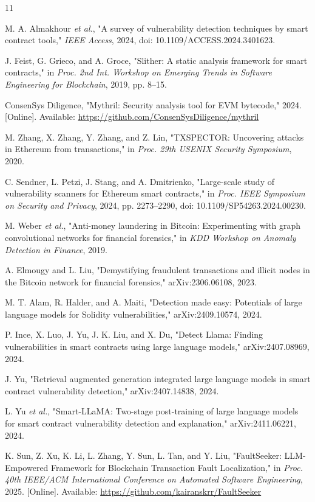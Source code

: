 \documentclass[conference]{IEEEtran}
\begin{document}
\begin{thebibliography}{11}

M. A. Almakhour \emph{et al.}, "A survey of vulnerability detection techniques by smart contract tools," \emph{IEEE Access}, 2024, doi: 10.1109/ACCESS.2024.3401623.

J. Feist, G. Grieco, and A. Groce, "Slither: A static analysis framework for smart contracts," in \emph{Proc. 2nd Int. Workshop on Emerging Trends in Software Engineering for Blockchain}, 2019, pp. 8--15.

ConsenSys Diligence, "Mythril: Security analysis tool for EVM bytecode," 2024. [Online]. Available: \url{https://github.com/ConsenSysDiligence/mythril}

M. Zhang, X. Zhang, Y. Zhang, and Z. Lin, "{TXSPECTOR}: Uncovering attacks in Ethereum from transactions," in \emph{Proc. 29th USENIX Security Symposium}, 2020.

C. Sendner, L. Petzi, J. Stang, and A. Dmitrienko, "Large-scale study of vulnerability scanners for Ethereum smart contracts," in \emph{Proc. IEEE Symposium on Security and Privacy}, 2024, pp. 2273--2290, doi: 10.1109/SP54263.2024.00230.

M. Weber \emph{et al.}, "Anti-money laundering in Bitcoin: Experimenting with graph convolutional networks for financial forensics," in \emph{KDD Workshop on Anomaly Detection in Finance}, 2019.

A. Elmougy and L. Liu, "Demystifying fraudulent transactions and illicit nodes in the Bitcoin network for financial forensics," arXiv:2306.06108, 2023.

M. T. Alam, R. Halder, and A. Maiti, "Detection made easy: Potentials of large language models for Solidity vulnerabilities," arXiv:2409.10574, 2024.

P. Ince, X. Luo, J. Yu, J. K. Liu, and X. Du, "Detect Llama: Finding vulnerabilities in smart contracts using large language models," arXiv:2407.08969, 2024.

J. Yu, "Retrieval augmented generation integrated large language models in smart contract vulnerability detection," arXiv:2407.14838, 2024.

L. Yu \emph{et al.}, "Smart-LLaMA: Two-stage post-training of large language models for smart contract vulnerability detection and explanation," arXiv:2411.06221, 2024.

K. Sun, Z. Xu, K. Li, L. Zhang, Y. Sun, L. Tan, and Y. Liu, "FaultSeeker: LLM-Empowered Framework for Blockchain Transaction Fault Localization," in \emph{Proc. 40th IEEE/ACM International Conference on Automated Software Engineering}, 2025. [Online]. Available: \url{https://github.com/kairanskrr/FaultSeeker}

\end{thebibliography}
\end{document}
